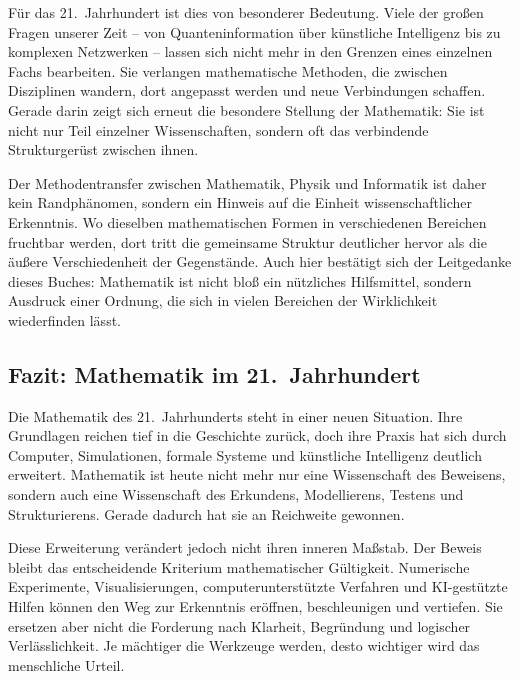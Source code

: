 Für das 21.~Jahrhundert ist dies von besonderer Bedeutung. Viele der großen Fragen unserer Zeit -- von Quanteninformation über künstliche Intelligenz bis zu komplexen Netzwerken -- lassen sich nicht mehr in den Grenzen eines einzelnen Fachs bearbeiten. Sie verlangen mathematische Methoden, die zwischen Disziplinen wandern, dort angepasst werden und neue Verbindungen schaffen. Gerade darin zeigt sich erneut die besondere Stellung der Mathematik: Sie ist nicht nur Teil einzelner Wissenschaften, sondern oft das verbindende Strukturgerüst zwischen ihnen.

Der Methodentransfer zwischen Mathematik, Physik und Informatik ist daher kein Randphänomen, sondern ein Hinweis auf die Einheit wissenschaftlicher Erkenntnis. Wo dieselben mathematischen Formen in verschiedenen Bereichen fruchtbar werden, dort tritt die gemeinsame Struktur deutlicher hervor als die äußere Verschiedenheit der Gegenstände. Auch hier bestätigt sich der Leitgedanke dieses Buches: Mathematik ist nicht bloß ein nützliches Hilfsmittel, sondern Ausdruck einer Ordnung, die sich in vielen Bereichen der Wirklichkeit wiederfinden lässt.


\subsection{Fazit: Mathematik im 21.~Jahrhundert}

Die Mathematik des 21.~Jahrhunderts steht in einer neuen Situation.
Ihre Grundlagen reichen tief in die Geschichte zurück,
doch ihre Praxis hat sich durch Computer,
Simulationen,
formale Systeme
und künstliche Intelligenz
deutlich erweitert.
Mathematik ist heute nicht mehr nur eine Wissenschaft des Beweisens,
sondern auch eine Wissenschaft des Erkundens,
Modellierens,
Testens
und Strukturierens.
Gerade dadurch hat sie an Reichweite gewonnen.

Diese Erweiterung verändert jedoch nicht ihren inneren Maßstab.
Der Beweis bleibt das entscheidende Kriterium
mathematischer Gültigkeit.
Numerische Experimente,
Visualisierungen,
computerunterstützte Verfahren
und KI-gestützte Hilfen
können den Weg zur Erkenntnis eröffnen,
beschleunigen und vertiefen.
Sie ersetzen aber nicht die Forderung nach Klarheit,
Begründung
und logischer Verlässlichkeit.
Je mächtiger die Werkzeuge werden,
desto wichtiger wird das menschliche Urteil.

